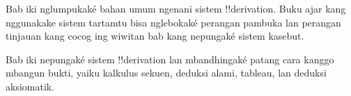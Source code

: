 \documentclass[../../../include/open-logic-chapter]{subfiles}
\begin{document}
      {}
      {}

\begin{editorial}
Bab iki nglumpukaké bahan umum ngenani sistem !!{derivation}.
Buku ajar kang nggunakake sistem tartamtu bisa nglebokaké perangan
pambuka lan perangan tinjauan kang cocog ing wiwitan bab kang
nepungaké sistem kasebut.
\end{editorial}

Bab iki nepungaké sistem !!{derivation} lan mbandhingaké patang cara
kanggo mbangun bukti, yaiku kalkulus sekuen, deduksi alami, tableau,
lan deduksi aksiomatik.






\OLEndChapterHook
\end{document}
